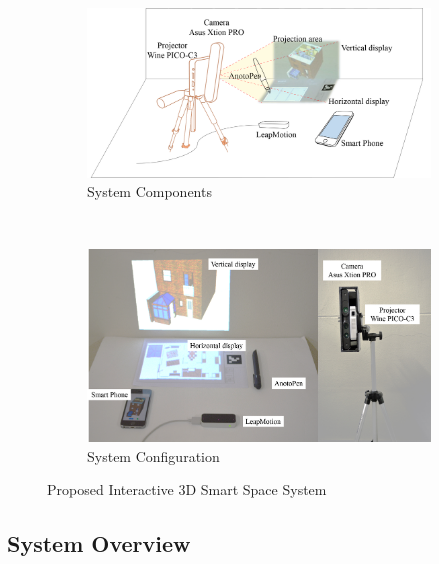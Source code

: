 \begin{figure}[ht!]
	\centering
        \begin{subfigure}[b]{1.0\columnwidth}
            \centering
            \includegraphics[width=\textwidth]{3-System/system_overview}
                \caption{System Components}
                \label{fig:port3dar}
        \end{subfigure}
        \\
        \begin{subfigure}[b]{1.0\columnwidth}
	        \centering
              \includegraphics[width=\textwidth]{3-System/system}
              \caption{System Configuration}
              \label{fig:hardware}
        \end{subfigure}%
	\caption{Proposed Interactive 3D Smart Space System}
    \label{fig:system}
\end{figure}
\subsection{System Overview}

